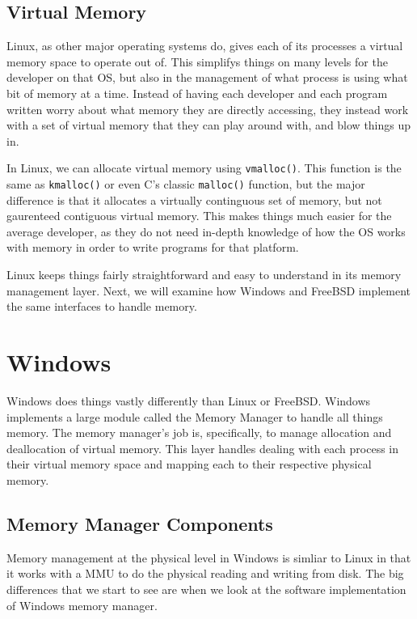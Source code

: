 \documentclass[10pt,letterpaper,onecolumn,draftclsnofoot]{IEEEtran}
\begin{document}
   \subsection{Virtual Memory}
   	Linux, as other major operating systems do, gives each of its processes
	a virtual memory space to operate out of. This simplifys things on many
	levels for the developer on that OS, but also in the management of what
	process is using what bit of memory at a time. Instead of having each
	developer and each program written worry about what memory they are 
	directly accessing, they instead work with a set of virtual memory that
	they can play around with, and blow things up in.

	In Linux, we can allocate virtual memory using \texttt{vmalloc()}. This
	function is the same as \texttt{kmalloc()} or even C's classic \texttt{malloc()}
	function, but the major difference is that it allocates a virtually
	continguous set of memory, but not gaurenteed contiguous virtual memory.
	This makes things much easier for the average developer, as they do not
	need in-depth knowledge of how the OS works with memory in order to write
	programs for that platform.

	Linux keeps things fairly straightforward and easy to understand in its
	memory management layer. Next, we will examine how Windows and FreeBSD
	implement the same interfaces to handle	memory.
  \section{Windows}
  Windows does things vastly differently than Linux or FreeBSD. Windows implements
  a large module called the Memory Manager to handle all things memory. The memory
  manager's job is, specifically, to manage allocation and deallocation of virtual
  memory. This layer handles dealing with each process in their virtual memory space
  and mapping each to their respective physical memory.
  \subsection{Memory Manager Components}
  Memory management at the physical level in Windows is simliar to Linux in that it
  works with a MMU to do the physical reading and writing from disk. The big
  differences that we start to see are when we look at the software implementation
  of Windows memory manager.
\end{document}
